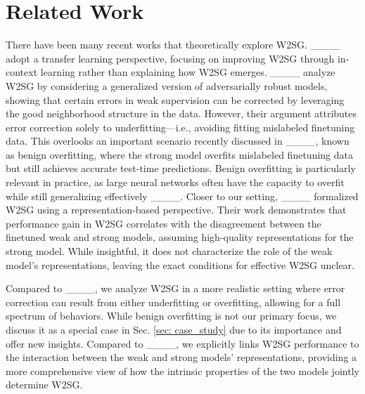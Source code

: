 \section{Related Work}
There have been many recent works that theoretically explore W2SG. ____ adopt a transfer learning perspective, focusing on improving W2SG through in-context learning rather than explaining how W2SG emerges. ____ analyze W2SG by considering a generalized version of adversarially robust models, showing that certain errors in weak supervision can be corrected by leveraging the good neighborhood structure in the data. However, their argument attributes error correction solely to underfitting—i.e., avoiding fitting mislabeled finetuning data.  This overlooks an important scenario recently discussed in ____, known as benign overfitting, where the strong model overfits mislabeled finetuning data but still achieves accurate test-time predictions. Benign overfitting is particularly relevant in practice, as large neural networks often have the capacity to overfit while still generalizing effectively ____. Closer to our setting, ____ formalized W2SG using a representation-based perspective. %
Their work demonstrates that performance gain in W2SG correlates with the disagreement between the finetuned weak and strong models, assuming high-quality representations for the strong model. While insightful, it does not characterize the role of the weak model's representations, leaving the exact conditions for effective W2SG unclear.

Compared to ____, we analyze W2SG in a more realistic setting where error correction can result from either underfitting or overfitting, allowing for a full spectrum of behaviors. While benign overfitting is not our primary focus, we discuss it as a special case in Sec. \ref{sec: case_study} due to its importance and offer new insights. Compared to ____, we explicitly links W2SG performance to the interaction between the weak and strong models' representations, providing a more comprehensive view of how the intrinsic properties of the two models jointly determine W2SG.




